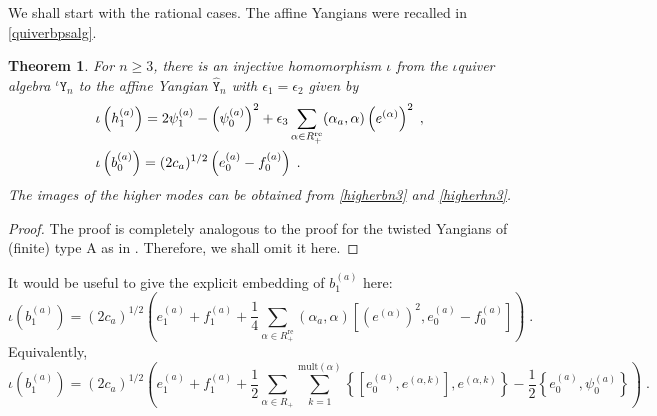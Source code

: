 \documentclass[11pt]{article}
\numberwithin{equation}{section}
\numberwithin{figure}{section}
\numberwithin{table}{section}
\newtheorem{theorem}{Theorem}[section]
\begin{document}
We shall start with the rational cases. The affine Yangians were recalled in \cref{quiverbpsalg}.
\begin{theorem}
	For $n\geq3$, there is an injective homomorphism $\iota$ from the $\iota$quiver algebra ${}^\iota\mathtt{Y}_n$ to the affine Yangian $\widehat{\mathtt{Y}}_n$ with $\epsilon_1=\epsilon_2$ given by
	\begin{subequations}
		\begin{align}
			&\iota\left(h^{(a)}_1\right)=2\psi^{(a)}_1-\left(\psi^{(a)}_0\right)^2+\epsilon_3\sum_{\alpha\in R^\textup{re}_+}(\alpha_a,\alpha)\left(e^{(\alpha)}\right)^2\;,\\
			&\iota\left(b^{(a)}_0\right)=(2c_a)^{1/2}\left(e^{(a)}_0-f^{(a)}_0\right)\;.
		\end{align}
	\end{subequations}
	The images of the higher modes can be obtained from \eqref{higherbn3} and \eqref{higherhn3}.
\end{theorem}
\begin{proof}
	The proof is completely analogous to the proof for the twisted Yangians of (finite) type A as in \cite[Theorem 4.1]{Lu_2026}. Therefore, we shall omit it here.
\end{proof}

It would be useful to give the explicit embedding of $b^{(a)}_1$ here:
\begin{equation}
	\iota\left(b^{(a)}_1\right)=(2c_a)^{1/2}\left(e^{(a)}_1+f^{(a)}_1+\frac{1}{4}\sum_{\alpha\in R^\text{re}_+}(\alpha_a,\alpha)\left[\left(e^{(\alpha)}\right)^2,e^{(a)}_0-f^{(a)}_0\right]\right)\;.
\end{equation}
Equivalently,
\begin{equation}
	\iota\left(b^{(a)}_1\right)=(2c_a)^{1/2}\left(e^{(a)}_1+f^{(a)}_1+\frac{1}{2}\sum_{\alpha\in R_+}\sum_{k=1}^{\mathrm{mult}(\alpha)}\left\{\left[e^{(a)}_0,e^{(\alpha,k)}\right],e^{(\alpha,k)}\right\}-\frac{1}{2}\left\{e^{(a)}_0,\psi^{(a)}_0\right\}\right)\;.
\end{equation}
\end{document}
